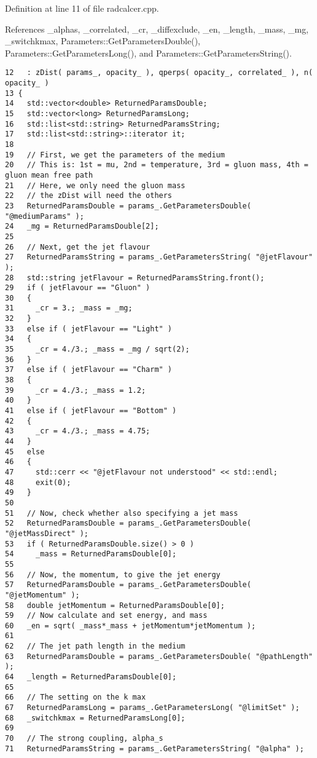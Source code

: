 Definition at line 11 of file radcalcer.cpp.

References \_\-alphas, \_\-correlated, \_\-cr, \_\-diffexclude, \_\-en, \_\-length, \_\-mass, \_\-mg, \_\-switchkmax, Parameters::GetParametersDouble(), Parameters::GetParametersLong(), and Parameters::GetParametersString().

\begin{Code}\begin{verbatim}12   : zDist( params_, opacity_ ), qperps( opacity_, correlated_ ), n( opacity_ )
13 {
14   std::vector<double> ReturnedParamsDouble;
15   std::vector<long> ReturnedParamsLong;
16   std::list<std::string> ReturnedParamsString;
17   std::list<std::string>::iterator it;
18 
19   // First, we get the parameters of the medium
20   // This is: 1st = mu, 2nd = temperature, 3rd = gluon mass, 4th = gluon mean free path
21   // Here, we only need the gluon mass
22   // the zDist will need the others
23   ReturnedParamsDouble = params_.GetParametersDouble( "@mediumParams" );
24   _mg = ReturnedParamsDouble[2];
25 
26   // Next, get the jet flavour
27   ReturnedParamsString = params_.GetParametersString( "@jetFlavour" );
28   std::string jetFlavour = ReturnedParamsString.front();
29   if ( jetFlavour == "Gluon" )
30   {
31     _cr = 3.; _mass = _mg;
32   }
33   else if ( jetFlavour == "Light" )
34   {
35     _cr = 4./3.; _mass = _mg / sqrt(2);
36   }
37   else if ( jetFlavour == "Charm" )
38   {
39     _cr = 4./3.; _mass = 1.2;
40   }
41   else if ( jetFlavour == "Bottom" )
42   {
43     _cr = 4./3.; _mass = 4.75;
44   }
45   else
46   {
47     std::cerr << "@jetFlavour not understood" << std::endl;
48     exit(0);
49   }
50 
51   // Now, check whether also specifying a jet mass
52   ReturnedParamsDouble = params_.GetParametersDouble( "@jetMassDirect" );
53   if ( ReturnedParamsDouble.size() > 0 )
54     _mass = ReturnedParamsDouble[0];
55   
56   // Now, the momentum, to give the jet energy
57   ReturnedParamsDouble = params_.GetParametersDouble( "@jetMomentum" );
58   double jetMomentum = ReturnedParamsDouble[0];
59   // Now calculate and set energy, and mass
60   _en = sqrt( _mass*_mass + jetMomentum*jetMomentum );
61 
62   // The jet path length in the medium
63   ReturnedParamsDouble = params_.GetParametersDouble( "@pathLength" );
64   _length = ReturnedParamsDouble[0];
65 
66   // The setting on the k max
67   ReturnedParamsLong = params_.GetParametersLong( "@limitSet" );
68   _switchkmax = ReturnedParamsLong[0];
69 
70   // The strong coupling, alpha_s
71   ReturnedParamsString = params_.GetParametersString( "@alpha" );

\end{verbatim}
\end{Code}
